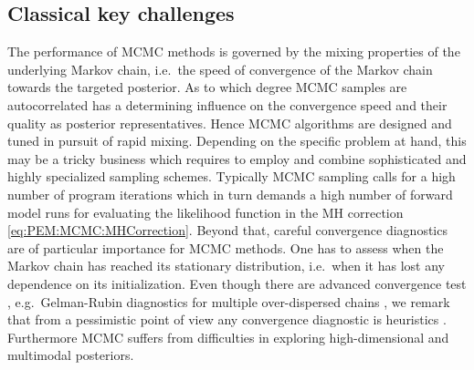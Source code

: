 \subsection{Classical key challenges} \label{sec:PEM:Computations:KeyChallenges}
The performance of MCMC methods is governed by the mixing properties of the underlying Markov chain, i.e.\ the speed of convergence of the Markov chain towards the targeted posterior.
As to which degree MCMC samples are autocorrelated has a determining influence on the convergence speed and their quality as posterior representatives.
Hence MCMC algorithms are designed and tuned in pursuit of rapid mixing.
Depending on the specific problem at hand, this may be a tricky business which requires to employ and combine sophisticated and highly specialized sampling schemes.
Typically MCMC sampling calls for a high number of program iterations which in turn demands a high number of forward model runs for evaluating the likelihood function in the MH correction \cref{eq:PEM:MCMC:MHCorrection}.
Beyond that, careful convergence diagnostics are of particular importance for MCMC methods.
One has to assess when the Markov chain has reached its stationary distribution, i.e.\ when it has lost any dependence on its initialization.
Even though there are advanced convergence test \cite{MCMC:Cowles1996,MCMC:Brooks1998:Roberts},
e.g.\ Gelman-Rubin diagnostics for multiple over-dispersed chains \cite{MCMC:Gelman1992,MCMC:Brooks1998:Gelman},
we remark that from a pessimistic point of view any convergence diagnostic is heuristics \cite{MCMC:Geyer2011:a}.
Furthermore MCMC suffers from difficulties in exploring high-dimensional and multimodal posteriors.

